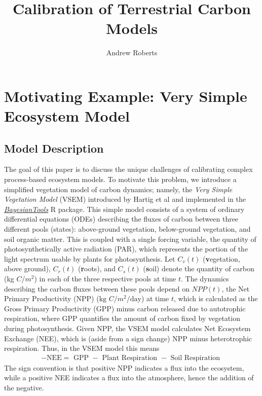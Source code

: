\documentclass[12pt]{article}
\title{Calibration of Terrestrial Carbon Models}
\author{Andrew Roberts}
\begin{document}
\maketitle
\tableofcontents
\newpage

\section{Motivating Example: Very Simple Ecosystem Model}

\subsection{Model Description}
The goal of this paper is to discuss the unique challenges of calibrating complex process-based ecosystem models. To motivate this problem, we introduce 
a simplified vegetation model of carbon dynamics; namely, the \textit{Very Simple Vegetation Model} (VSEM) introduced by Hartig et al \cite{Hartig} and implemented 
in the \href{https://github.com/florianhartig/BayesianTools}{\textit{BayesianTools}} R package. 
This simple model consists of a system of ordinary differential equations (ODEs) describing the fluxes of carbon between three different pools (states): 
above-ground vegetation, below-ground vegetation, and soil organic matter. This is coupled with a single forcing variable, the quantity of photosynthetically 
active radiation (PAR), which represents the portion of the light spectrum usable by plants for photosynthesis. 
Let $C_v(t)$ (\textbf{v}egetation, above ground), $C_r(t)$ (\textbf{r}oots), and $C_s(t)$ (\textbf{s}oil) denote the quantity of carbon (kg $C/m^2$) in each of the three respective pools at time $t$. 
The dynamics describing the carbon fluxes between these pools depend on $NPP(t)$, the Net Primary Productivity (NPP) ($\text{kg } C/m^2/\text{day}$) at time $t$, 
which is calculated as the Gross Primary Productivity (GPP) minus carbon released due to autotrophic respiration, where GPP quantifies the amount of carbon 
fixed by vegetation during photosynthesis. Given NPP, the VSEM model calculates Net Ecosystem Exchange (NEE), which is (aside from a sign change) 
NPP minus heterotrophic 
respiration. Thus, in the VSEM model this means 
\begin{align}
-\text{NEE} = \text{ GPP } - \text{ Plant Respiration } - \text{ Soil Respiration } 
\end{align}
The sign convention is that positive NPP indicates a flux into the ecosystem, while a positive NEE indicates a flux into the atmosphere, hence the addition of the negative. 
\end{document}
